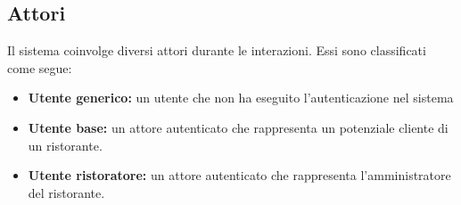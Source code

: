 \subsection{Attori}
Il sistema coinvolge diversi attori durante le interazioni. 
Essi sono classificati come segue:
\begin{itemize}
	\item \textbf{Utente generico:} un utente che non ha eseguito l'autenticazione nel sistema
	\item \textbf{Utente base:}  un attore autenticato che rappresenta un potenziale cliente di un ristorante.
	\item \textbf{Utente ristoratore:} un attore autenticato che rappresenta l'amministratore del ristorante.
\end{itemize}
